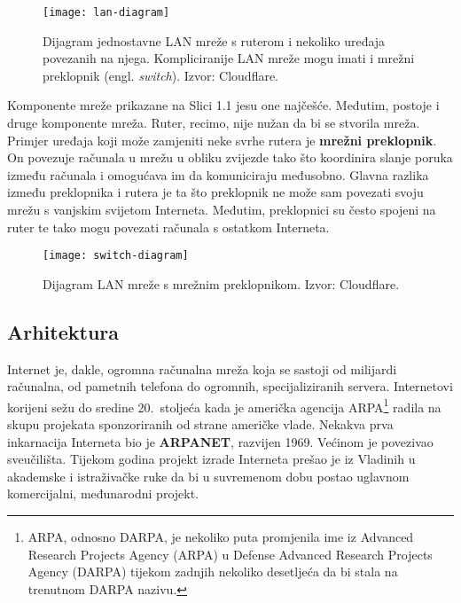\begin{figure}[h]\label{fig:lan-diagram}
    \centering
    \vspace*{-3cm}
    \texttt{[image: lan-diagram]}
    \vspace*{-3cm}
    \caption{Dijagram jednostavne LAN mreže s ruterom i nekoliko uređaja povezanih na njega. Kompliciranije LAN mreže mogu imati i mrežni preklopnik (engl. \textit{switch}). Izvor: Cloudflare.}
\end{figure}

Komponente mreže prikazane na Slici 1.1 jesu one najčešće.
Međutim, postoje i druge komponente mreža.
Ruter, recimo, nije nužan da bi se stvorila mreža.
Primjer uređaja koji može zamjeniti neke svrhe rutera je \textbf{mrežni preklopnik}.
On povezuje računala u mrežu u obliku zvijezde tako što koordinira slanje poruka između računala i omogućava im da komuniciraju međusobno.
Glavna razlika između preklopnika i rutera je ta što preklopnik ne može sam povezati svoju mrežu s vanjskim svijetom Interneta.
Međutim, preklopnici su često spojeni na ruter te tako mogu povezati računala s ostatkom Interneta.

\begin{figure}[h]\label{fig:switch-lan-diagram}
    \texttt{[image: switch-diagram]}
    \raggedleft
    \caption{Dijagram LAN mreže s mrežnim preklopnikom. Izvor: Cloudflare.}
\end{figure}

\newpage
\subsection{Arhitektura}\label{subsec:arhitektura}

Internet je, dakle, ogromna računalna mreža koja se sastoji od milijardi računalna, od pametnih telefona do ogromnih, specijaliziranih servera.
Internetovi korijeni sežu do sredine 20.\ stoljeća kada je američka agencija ARPA\footnote{ARPA, odnosno DARPA, je nekoliko puta promjenila ime iz Advanced Research Projects Agency (ARPA) u Defense Advanced Research Projects Agency (DARPA) tijekom zadnjih nekoliko desetljeća da bi stala na trenutnom DARPA nazivu.} radila na skupu projekata sponzoriranih od strane američke vlade.
Nekakva prva inkarnacija Interneta bio je \textbf{ARPANET}, razvijen 1969.
Većinom je povezivao sveučilišta.
Tijekom godina projekt izrade Interneta prešao je iz Vladinih u akademske i istraživačke ruke da bi u suvremenom dobu postao uglavnom komercijalni, međunarodni projekt.

